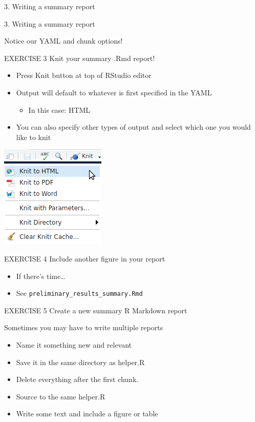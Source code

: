 \documentclass[
  ignorenonframetext,
]{beamer}
\providecommand{\tightlist}{%
  \setlength{\itemsep}{0pt}\setlength{\parskip}{0pt}}
\begin{document}
\begin{frame}[fragile]{3. Writing a summary report}
\begin{block}{3. Writing a summary report}
\begin{block}{Notice our YAML and chunk options!}
\end{block}

\end{block}

\begin{block}{EXERCISE 3 \textbar{} Knit your summary .Rmd report!}

\begin{itemize}
\tightlist
\item
  Press Knit button at top of RStudio editor
\item
  Output will default to whatever is first specified in the YAML

  \begin{itemize}
  \tightlist
  \item
    In this case: HTML
  \end{itemize}
\item
  You can also specify other types of output and select which one you
  would like to knit
\end{itemize}

\includegraphics{images/knit.png}

\end{block}

\begin{block}{EXERCISE 4 \textbar{} Include another figure in your
report}

\begin{itemize}
\tightlist
\item
  If there's time\ldots{}
\item
  See \texttt{preliminary\_results\_summary.Rmd}
\end{itemize}

\end{block}

\begin{block}{EXERCISE 5 \textbar{} Create a new summary R Markdown
report}

Sometimes you may have to write multiple reports

\begin{itemize}
\tightlist
\item
  Name it something new and relevant
\item
  Save it in the same directory as helper.R
\item
  Delete everything after the first chunk.
\item
  Source to the same helper.R
\item
  Write some text and include a figure or table
\end{itemize}


\end{block}
\end{frame}
\end{document}

